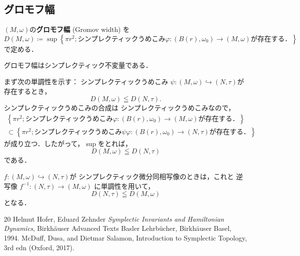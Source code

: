 \subsection*{グロモフ幅}
\((M,\omega)\)の\textbf{グロモフ幅} (Gromov width) を
\[
    D(M,\omega)\coloneqq
    \sup\left\{
        \pi r^2;
        \text{シンプレクティックうめこみ\(\varphi\colon(B(r),\omega_{0})\to(M,\omega)\)が存在する．}
    \right\}
\]で定める．
\begin{STT*}
    グロモフ幅はシンプレクティック不変量である．
\end{STT*}
まず次の単調性を示す：
シンプレクティックうめこみ
\(\psi\colon(M,\omega)\hookrightarrow (N,\tau)\)が存在するとき，
\begin{equation}
    D(M,\omega)\leqq D(N,\tau).
\end{equation}
シンプレクティックうめこみの合成は
シンプレクティックうめこみなので，
\begin{align*}
    \left\{
        \pi r^2;
        \text{シンプレクティックうめこみ\(\varphi\colon(B(r),\omega_{0})\to(M,\omega)\)が存在する．}
    \right\}\\
    \subset
    \left\{
        \pi r^2;
        \text{シンプレクティックうめこみ\(\psi\varphi\colon(B(r),\omega_{0})\to(N,\tau)\)が存在する．}
    \right\}
\end{align*}
が成り立つ．したがって，\(\sup\)をとれば，
\[
    D(M,\omega)\leqq D(N,\tau)
\]
である．

\(f\colon(M,\omega)\hookrightarrow (N,\tau)\)が
シンプレクティック微分同相写像のときは，これと
逆写像
\(f^{-1}\colon(N,\tau)\to (M,\omega)\)
に単調性を用いて，
\[
    D(N,\tau)\leqq D(M,\omega)
\]となる．
\begin{thebibliography}{20} 
    Helmut Hofer, Eduard Zehnder
    \textit{Symplectic Invariants and Hamiltonian Dynamics}, 
    Birkh\"auser Advanced Texts Basler Lehrb\"ucher, Birkh\"auser Basel, 1994.
     McDuff, Dusa, 
    and Dietmar Salamon, 
    Introduction to Symplectic Topology, 
    3rd edn (Oxford, 2017).
\end{thebibliography}




